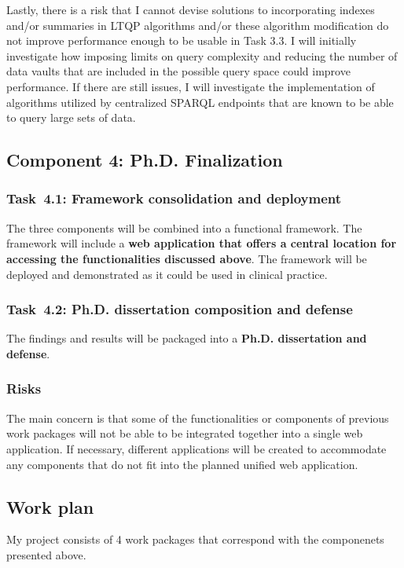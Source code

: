 \documentclass[a4paper,11pt]{article}
\begin{document}
\begin{refsection}
Lastly, there is a risk that I cannot devise solutions to incorporating indexes and/or summaries in LTQP algorithms and/or these algorithm modification do not improve performance enough to be usable in Task 3.3.
I will initially investigate how imposing limits on query complexity and reducing the number of data vaults that are included in the possible query space could improve performance.
If there are still issues, I will investigate the implementation of algorithms utilized by centralized SPARQL endpoints that are known to be able to query large sets of data. 


\newcommand\WPd{Ph.D. Finalization}
\subsection{Component 4: \WPd}
\newcommand\WPda{Framework consolidation and deployment}
\subsubsection{Task~4.1: \WPda}
The three components will be combined into a functional framework. 
The framework will include a \textbf{web application that offers a central location for accessing the functionalities discussed above}.
The framework will be deployed and demonstrated as it could be used in clinical practice.

\newcommand\WPdb{Ph.D. dissertation composition and defense}
\subsubsection{Task~4.2: \WPdb}
The findings and results will be packaged into a \textbf{Ph.D. dissertation and defense}.

\subsubsection{Risks}
The main concern is that some of the functionalities or components of previous work packages will not be able to be integrated together into a single web application. 
If necessary, different applications will be created to accommodate any components that do not fit into the planned unified web application.

\newpage
\subsection{Work plan}
\smallskip

\noindent
My project consists of 4 work packages that correspond with the componenets presented above. 



\end{refsection}
\end{document}
